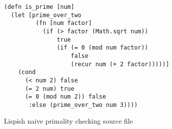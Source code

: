 \begin{figure}[ht]
\begin{verbatim}
(defn is_prime [num]
  (let [prime_over_two
         (fn [num factor]
           (if (> factor (Math.sqrt num))
               true
               (if (= 0 (mod num factor))
                   false
                   (recur num (+ 2 factor)))))]
    (cond
      (< num 2) false
      (= 2 num) true
      (= 0 (mod num 2)) false
       :else (prime_over_two num 3))))
\end{verbatim}
\caption{Lispish naive primality checking source file}
\label{fig:primality-checking-input}
\end{figure}
